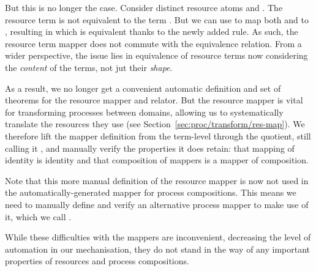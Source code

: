 \documentclass[class=smolathesis,crop=false]{standalone}
\begin{document}
But this is no longer the case.
Consider distinct resource atoms  and .
The resource term  is not equivalent to the term .
But we can use  to map both  and  to , resulting in  which is equivalent  thanks to the newly added rule.
As such, the resource term mapper does not commute with the equivalence relation.
From a wider perspective, the issue lies in equivalence of resource terms now considering the \emph{content} of the terms, not jut their \emph{shape}.

As a result, we no longer get a convenient automatic definition and set of theorems for the resource mapper and relator.
But the resource mapper is vital for transforming processes between domains, allowing us to systematically translate the resources they use (see Section~\ref{sec:proc/transform/res-map}).
We therefore lift the mapper definition from the term-level through the quotient, still calling it , and manually verify the properties it does retain: that mapping of identity is identity and that composition of mappers is a mapper of composition.

Note that this more manual definition of the resource mapper is now not used in the automatically-generated mapper for process compositions.
This means we need to manually define and verify an alternative process mapper to make use of it, which we call .

While these difficulties with the mappers are inconvenient, decreasing the level of automation in our mechanisation, they do not stand in the way of any important properties of resources and process compositions.\footnotemark

\end{document}
